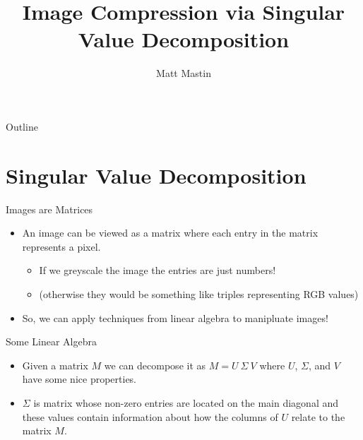 \documentclass{beamer}
\title[SVD Image Compression] %
{Image Compression via Singular Value Decomposition}
\author[Matt Mastin]%
{Matt Mastin\inst{}}
\institute[Universities of Somewhere and Elsewhere] %
{
  \inst{}%
  Data Software Engineer\\
  MailChimp
  }
\begin{document}
\begin{frame}
  \titlepage
\end{frame}

\begin{frame}{Outline}
  \tableofcontents
\end{frame}







\section{Singular Value Decomposition}

\begin{frame}{Images are Matrices}
\begin{itemize}

\item An image can be viewed as a matrix where each entry in the matrix represents a pixel.

	\begin{itemize}
	\item<2-> If we greyscale the image the entries are just numbers!
	\item<3-> (otherwise they would be something like triples representing RGB values)
	\end{itemize}

\item<4-> So, we can apply techniques from linear algebra to manipluate images!

\end{itemize}  
\end{frame}

\begin{frame}{Some Linear Algebra}
\begin{itemize}

\item Given a matrix $M$ we can decompose it as $M = U~\Sigma~V$ where $U$, $\Sigma$, and $V$ have some nice properties.

\item<2-> $\Sigma$ is matrix whose non-zero entries are located on the main diagonal and these values contain information about how the columns of $U$ relate to the matrix $M$.

\end{itemize}  
\end{frame}
\end{document}
